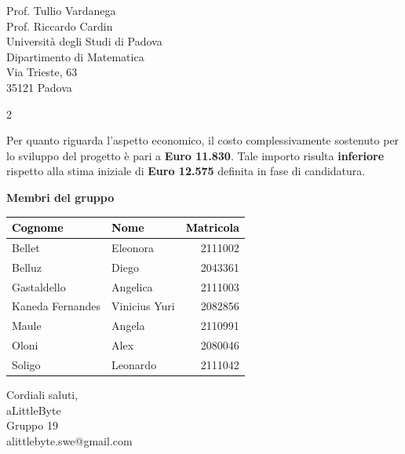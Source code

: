 \documentclass[a4paper,11pt]{letter}
\makeatletter
\newcommand{\GruppoFirma}{aLittleByte\\Gruppo 19\\alittlebyte.swe@gmail.com}
\makeatother
\begin{document}
\begin{letter}{Prof. Tullio Vardanega\\Prof. Riccardo Cardin\\Università degli Studi di Padova\\Dipartimento di Matematica\\Via Trieste, 63\\35121 Padova}
\begin{multicols}{2}
\begin{itemize}[noitemsep, topsep=0pt]
  \end{itemize}
  \end{multicols}

  \vspace{0.3em}

  Per quanto riguarda l'aspetto economico, il costo complessivamente sostenuto per lo sviluppo del progetto è pari a \textbf{Euro 11.830}. Tale importo risulta \textbf{inferiore} rispetto alla stima iniziale di \textbf{Euro 12.575} definita in fase di candidatura.

    \vspace{2.0em}
    
    \textbf{Membri del gruppo}
  \begin{center}
  \setlength{\arrayrulewidth}{0.8pt}
  \begin{tabular}{|l|l|r|}
  \hline
  \rowcolor{primarycolor!20}
  \textcolor{black}{\textbf{Cognome}} & \textcolor{black}{\textbf{Nome}} & \textcolor{black}{\textbf{Matricola}} \\
  \hline
  Bellet & Eleonora & 2111002\\
  \hline
  Belluz & Diego & 2043361\\
  \hline
  Gastaldello & Angelica & 2111003\\
  \hline
  Kaneda Fernandes & Vinicius Yuri & 2082856 \\
  \hline
  Maule & Angela & 2110991\\
  \hline
  Oloni & Alex & 2080046\\
  \hline
  Soligo & Leonardo & 2111042\\
  \hline
  \end{tabular}
  \end{center}

  \vspace{0.8em}

  \closing{Cordiali saluti, \vspace{1.2em} \\ \GruppoFirma}

  \end{letter}

  
\end{document}
